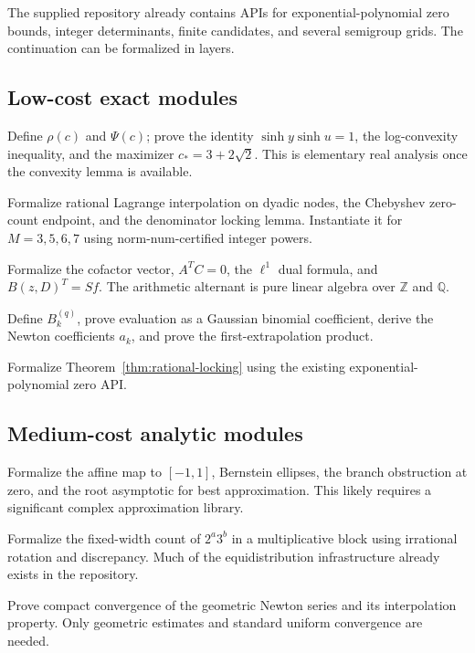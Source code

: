 \documentclass[11pt,oneside]{article}
\theoremstyle{definition}
\theoremstyle{remark}
\newcommand{\Z}{\mathbb Z}
\newcommand{\Q}{\mathbb Q}
\begin{document}
The supplied repository already contains APIs for exponential-polynomial zero bounds,
integer determinants, finite candidates, and several semigroup grids.  The continuation can
be formalized in layers.

\subsection{Low-cost exact modules}

\begin{description}[style=nextline]
\item[\texttt{OptimalBernsteinBlock}]
Define $\rho(c)$ and $\Psi(c)$; prove the identity $\sinh y\sinh u=1$, the log-convexity
inequality, and the maximizer $c_*=3+2\sqrt2$.  This is elementary real analysis once the
convexity lemma is available.

\item[\texttt{DyadicInterpolationCertificate}]
Formalize rational Lagrange interpolation on dyadic nodes, the Chebyshev zero-count endpoint,
and the denominator locking lemma.  Instantiate it for $M=3,5,6,7$ using norm-num-certified
integer powers.

\item[\texttt{DiscreteCofactorAlternation}]
Formalize the cofactor vector, $A^TC=0$, the $\ell^1$ dual formula, and
$B(z,D)^T=Sf$.  The arithmetic alternant is pure linear algebra over $\Z$ and $\Q$.

\item[\texttt{GeometricNewtonBasis}]
Define $B_k^{(q)}$, prove evaluation as a Gaussian binomial coefficient, derive the Newton
coefficients $a_k$, and prove the first-extrapolation product.

\item[\texttt{RationalPowerLocking}]
Formalize Theorem~\ref{thm:rational-locking} using the existing exponential-polynomial zero
API.
\end{description}

\subsection{Medium-cost analytic modules}

\begin{description}[style=nextline]
\item[\texttt{PowerBernsteinRate}]
Formalize the affine map to $[-1,1]$, Bernstein ellipses, the branch obstruction at zero, and
the root asymptotic for best approximation.  This likely requires a significant complex
approximation library.

\item[\texttt{SmoothThinStripCount}]
Formalize the fixed-width count of $2^a3^b$ in a multiplicative block using irrational
rotation and discrepancy.  Much of the equidistribution infrastructure already exists in the
repository.

\item[\texttt{EntireNewtonShadow}]
Prove compact convergence of the geometric Newton series and its interpolation property.
Only geometric estimates and standard uniform convergence are needed.
\end{description}
\end{document}
